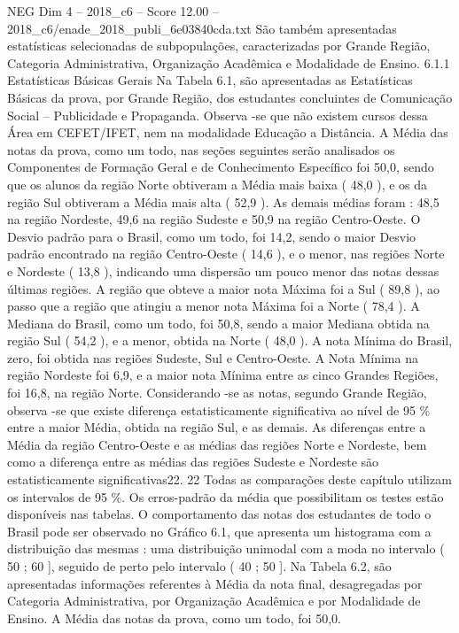 \begin{textsample}{NEG Dim 4 – 2018\_c6 – Score 12.00 – 2018\_c6/enade\_2018\_publi\_6e03840cda.txt}
São também apresentadas estatísticas selecionadas de subpopulações, caracterizadas por Grande Região, Categoria Administrativa, Organização Acadêmica e Modalidade de Ensino. 6.1.1 Estatísticas Básicas Gerais Na Tabela 6.1, são apresentadas as Estatísticas Básicas da prova, por Grande Região, dos estudantes concluintes de Comunicação Social – Publicidade e Propaganda.
Observa -se que não existem cursos dessa Área em CEFET/IFET, nem na modalidade Educação a Distância.
A Média das notas da prova, como um todo, nas seções seguintes serão analisados os Componentes de Formação Geral e de Conhecimento Específico foi 50,0, sendo que os alunos da região Norte obtiveram a Média mais baixa ( 48,0 ), e os da região Sul obtiveram a Média mais alta ( 52,9 ).
As demais médias foram : 48,5 na região Nordeste, 49,6 na região Sudeste e 50,9 na região Centro-Oeste.
O Desvio padrão para o Brasil, como um todo, foi 14,2, sendo o maior Desvio padrão encontrado na região Centro-Oeste ( 14,6 ), e o menor, nas regiões Norte e Nordeste ( 13,8 ), indicando uma dispersão um pouco menor das notas dessas últimas regiões.
A região que obteve a maior nota Máxima foi a Sul ( 89,8 ), ao passo que a região que atingiu a menor nota Máxima foi a Norte ( 78,4 ).
A Mediana do Brasil, como um todo, foi 50,8, sendo a maior Mediana obtida na região Sul ( 54,2 ), e a menor, obtida na Norte ( 48,0 ).
A nota Mínima do Brasil, zero, foi obtida nas regiões Sudeste, Sul e Centro-Oeste.
A Nota Mínima na região Nordeste foi 6,9, e a maior nota Mínima entre as cinco Grandes Regiões, foi 16,8, na região Norte.
Considerando -se as notas, segundo Grande Região, observa -se que existe diferença estatisticamente significativa ao nível de 95 \% entre a maior Média, obtida na região Sul, e as demais.
As diferenças entre a Média da região Centro-Oeste e as médias das regiões Norte e Nordeste, bem como a diferença entre as médias das regiões Sudeste e Nordeste são estatisticamente significativas22. 22 Todas as comparações deste capítulo utilizam os intervalos de 95 \%.
Os erros-padrão da média que possibilitam os testes estão disponíveis nas tabelas.
O comportamento das notas dos estudantes de todo o Brasil pode ser observado no Gráfico 6.1, que apresenta um histograma com a distribuição das mesmas : uma distribuição unimodal com a moda no intervalo ( 50 ; 60 ], seguido de perto pelo intervalo ( 40 ; 50 ].
Na Tabela 6.2, são apresentadas informações referentes à Média da nota final, desagregadas por Categoria Administrativa, por Organização Acadêmica e por Modalidade de Ensino.
A Média das notas da prova, como um todo, foi 50,0.

\end{textsample}
